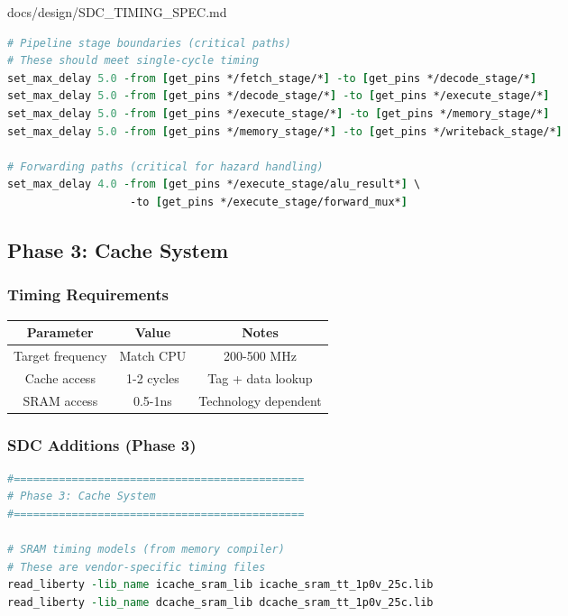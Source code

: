 \begin{relocated}{docs/design/SDC_TIMING_SPEC.md}
\begin{lstlisting}[language=tcl]
# Pipeline stage boundaries (critical paths)
# These should meet single-cycle timing
set_max_delay 5.0 -from [get_pins */fetch_stage/*] -to [get_pins */decode_stage/*]
set_max_delay 5.0 -from [get_pins */decode_stage/*] -to [get_pins */execute_stage/*]
set_max_delay 5.0 -from [get_pins */execute_stage/*] -to [get_pins */memory_stage/*]
set_max_delay 5.0 -from [get_pins */memory_stage/*] -to [get_pins */writeback_stage/*]

# Forwarding paths (critical for hazard handling)
set_max_delay 4.0 -from [get_pins */execute_stage/alu_result*] \
                   -to [get_pins */execute_stage/forward_mux*]
\end{lstlisting}

\subsection{Phase 3: Cache System}\label{ds:ch:sdc-timing-spec:phase-3-cache-system}

\subsubsection{Timing Requirements}\label{ds:ch:sdc-timing-spec:timing-requirements-2}

{
\begin{longtable}[]{@{}ccc@{}}
\toprule\noalign{}
Parameter & Value & Notes \\
\midrule\noalign{}
\endhead
\bottomrule\noalign{}
\endlastfoot
Target frequency & Match CPU & 200-500 MHz \\
Cache access & 1-2 cycles & Tag + data lookup \\
SRAM access & 0.5-1ns & Technology dependent \\
\end{longtable}
}

\subsubsection{SDC Additions (Phase 3)}\label{ds:ch:sdc-timing-spec:sdc-additions-phase-3}

\begin{lstlisting}[language=tcl]
#=============================================
# Phase 3: Cache System
#=============================================

# SRAM timing models (from memory compiler)
# These are vendor-specific timing files
read_liberty -lib_name icache_sram_lib icache_sram_tt_1p0v_25c.lib
read_liberty -lib_name dcache_sram_lib dcache_sram_tt_1p0v_25c.lib


\end{lstlisting}
\end{relocated}
